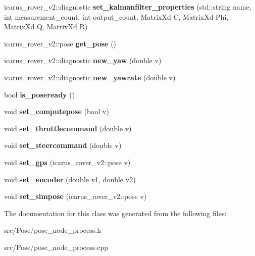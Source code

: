 \begin{DoxyCompactItemize}
\item 
\mbox{\label{classPoseNodeProcess_ab776e37c12b1df4160515b0af68d2ecc}} 
icarus\+\_\+rover\+\_\+v2\+::diagnostic {\bfseries set\+\_\+kalmanfilter\+\_\+properties} (std\+::string name, int measurement\+\_\+count, int output\+\_\+count, Matrix\+Xd C, Matrix\+Xd Phi, Matrix\+Xd Q, Matrix\+Xd R)
\item 
\mbox{\label{classPoseNodeProcess_af974a6221ea584dacf3852ba8acb1c01}} 
icarus\+\_\+rover\+\_\+v2\+::pose {\bfseries get\+\_\+pose} ()
\item 
\mbox{\label{classPoseNodeProcess_a70574604a76bc35646868bb7487ff6ee}} 
icarus\+\_\+rover\+\_\+v2\+::diagnostic {\bfseries new\+\_\+yaw} (double v)
\item 
\mbox{\label{classPoseNodeProcess_a787a8fd999f7d00f34f0b11fc4222f47}} 
icarus\+\_\+rover\+\_\+v2\+::diagnostic {\bfseries new\+\_\+yawrate} (double v)
\item 
\mbox{\label{classPoseNodeProcess_ac8e485b06c72696db8f025a205aad0d1}} 
bool {\bfseries is\+\_\+poseready} ()
\item 
\mbox{\label{classPoseNodeProcess_a72297fc3c02680a2a7472c3c00956162}} 
void {\bfseries set\+\_\+computepose} (bool v)
\item 
\mbox{\label{classPoseNodeProcess_ad90bac7a6bbc522e191e3265a3ae1747}} 
void {\bfseries set\+\_\+throttlecommand} (double v)
\item 
\mbox{\label{classPoseNodeProcess_a709f8c88fbffeb01c01a69d7cbcf1aa3}} 
void {\bfseries set\+\_\+steercommand} (double v)
\item 
\mbox{\label{classPoseNodeProcess_a979ea845ef8618a6f6ad69d1373db70a}} 
void {\bfseries set\+\_\+gps} (icarus\+\_\+rover\+\_\+v2\+::pose v)
\item 
\mbox{\label{classPoseNodeProcess_a1a1e87f3b9ee49730fe933b1ff5731ff}} 
void {\bfseries set\+\_\+encoder} (double v1, double v2)
\item 
\mbox{\label{classPoseNodeProcess_a16a50ebe65565853b14a36f6950d0a92}} 
void {\bfseries set\+\_\+simpose} (icarus\+\_\+rover\+\_\+v2\+::pose v)
\end{DoxyCompactItemize}


The documentation for this class was generated from the following files\+:\begin{DoxyCompactItemize}
\item 
src/\+Pose/pose\+\_\+node\+\_\+process.\+h\item 
src/\+Pose/pose\+\_\+node\+\_\+process.\+cpp\end{DoxyCompactItemize}
